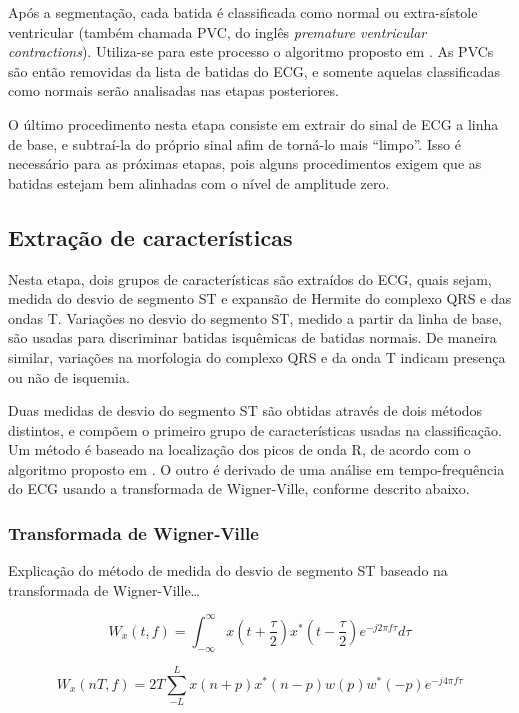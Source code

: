Após a segmentação, cada batida é classificada como normal ou extra-sístole ventricular (também chamada PVC, do inglês \emph{premature ventricular contractions}). Utiliza-se para este processo o algoritmo proposto em \cite{Couceiro08}. As PVCs são então removidas da lista de batidas do ECG, e somente aquelas classificadas como normais serão analisadas nas etapas posteriores.

O último procedimento nesta etapa consiste em extrair do sinal de ECG a linha de base, e subtraí-la do próprio sinal afim de torná-lo mais ``limpo''. Isso é necessário para as próximas etapas, pois alguns procedimentos exigem que as batidas estejam bem alinhadas com o nível de amplitude zero.

\subsection{Extração de características}
Nesta etapa, dois grupos de características são extraídos do ECG, quais sejam, medida do desvio de segmento ST e expansão de Hermite do complexo QRS e das ondas T. Variações no desvio do segmento ST, medido a partir da linha de base, são usadas para discriminar batidas isquêmicas de batidas normais. De maneira similar, variações na morfologia do complexo QRS e da onda T indicam presença ou não de isquemia.

Duas medidas de desvio do segmento ST são obtidas através de dois métodos distintos, e compõem o primeiro grupo de características usadas na classificação. Um método é baseado na localização dos picos de onda R, de acordo com o algoritmo proposto em \cite{Pang05}. O outro é derivado de uma análise em tempo-frequência do ECG usando a transformada de Wigner-Ville, conforme descrito abaixo.

\subsubsection{Transformada de Wigner-Ville}
Explicação do método de medida do desvio de segmento ST baseado na transformada de Wigner-Ville\ldots

\begin{equation} \label{equ:wigner_ville}
    W_x(t,f) = \int_{-\infty}^{\infty} x\left( t+\frac{\tau}{2} \right) x^*\left( t-\frac{\tau}{2} \right) e^{-j2\pi f \tau} d\tau
\end{equation}

\begin{equation} \label{equ:pseudo_wigner_ville}
    W_x(nT,f) = 2T\sum_{-L}^{L}x(n+p)x^*(n-p)w(p)w^*(-p)e^{-j4\pi f\tau}
\end{equation}


